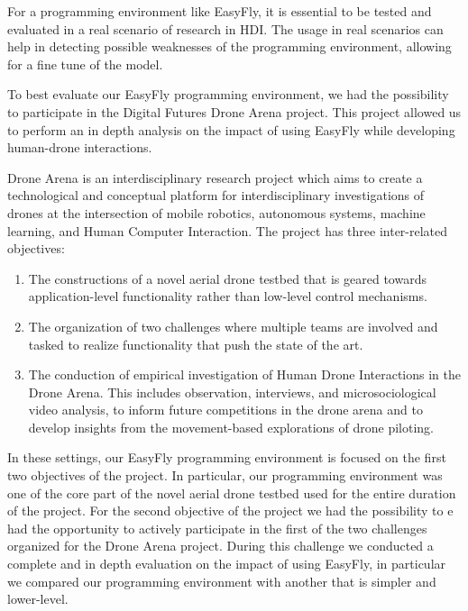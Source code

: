 For a programming environment like EasyFly, it is essential to be tested and evaluated in a real scenario of
research in HDI. The usage in real scenarios can help in detecting possible weaknesses of the programming environment,
allowing for a fine tune of the model.

To best evaluate our EasyFly programming environment, we had the possibility to participate in the
Digital Futures Drone Arena project. This project allowed us to perform an in depth analysis on the impact of
using EasyFly while developing human-drone interactions.

Drone Arena is an interdisciplinary research project which aims to create a technological and conceptual platform for
interdisciplinary investigations of drones at the intersection of mobile robotics, autonomous systems, machine learning,
and Human Computer Interaction.
The project has three inter-related objectives:
\begin{enumerate}
    \item   The constructions of a novel aerial drone testbed that is geared towards application-level
            functionality rather than low-level control mechanisms.
    \item   The organization of two challenges where multiple teams are involved and tasked to realize
            functionality that push the state of the art.
    \item   The conduction of empirical investigation of Human Drone Interactions in the Drone Arena.
            This includes observation, interviews, and microsociological video analysis, to inform future
            competitions in the drone arena and to develop insights from the movement-based explorations of drone piloting.
\end{enumerate}

In these settings, our EasyFly programming environment is focused on the first two objectives of the project.
In particular, our programming environment was one of the core part of the novel aerial drone testbed
used for the entire duration of the project. 
For the second objective of the project we had the possibility to e had the opportunity to actively participate
in the first of the two challenges organized for the Drone Arena project. During this challenge we conducted
a complete and in depth evaluation on the impact of using EasyFly, in particular we compared our programming
environment with another that is simpler and lower-level.



